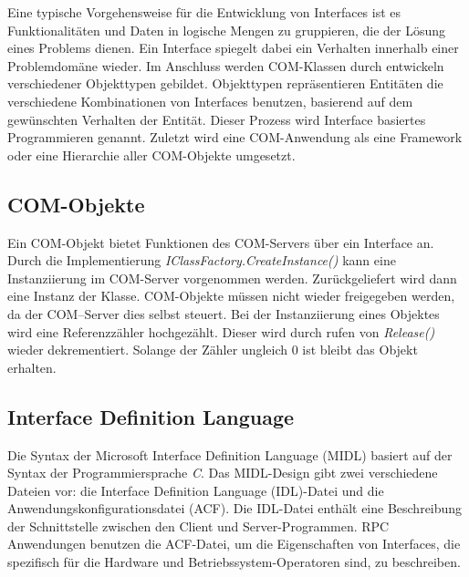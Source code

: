 Eine typische Vorgehensweise für die Entwicklung von Interfaces ist es Funktionalitäten und Daten in logische Mengen zu gruppieren, die der Lösung eines Problems dienen. Ein Interface spiegelt dabei ein Verhalten innerhalb einer Problemdomäne wieder. Im Anschluss werden COM-Klassen durch entwickeln verschiedener Objekttypen gebildet. Objekttypen repräsentieren Entitäten die verschiedene Kombinationen von Interfaces benutzen, basierend auf dem gewünschten Verhalten der Entität. Dieser Prozess wird Interface basiertes Programmieren genannt. Zuletzt wird eine COM-Anwendung als eine Framework oder eine Hierarchie aller COM-Objekte umgesetzt.

\subsection{COM-Objekte}
\label{ch:grundlagen:sec:ComponentObjectModel:subsec:COMObjekte}

Ein COM-Objekt bietet Funktionen des COM-Servers über ein Interface an. Durch die Implementierung \textit{IClassFactory.CreateInstance()} kann eine Instanziierung im COM-Server vorgenommen werden. Zurückgeliefert wird dann eine Instanz der Klasse. COM-Objekte müssen nicht wieder freigegeben werden, da der COM–Server dies selbst steuert. Bei der Instanziierung eines Objektes  wird eine Referenzzähler hochgezählt. Dieser wird durch rufen von \textit{Release()} wieder dekrementiert. Solange der Zähler ungleich 0 ist bleibt das Objekt erhalten. 

\subsection{Interface Definition Language}
\label{ch:grundlagen:sec:ComponentObjectModel:subsec:InterfaceDefinitionLanguage}

Die Syntax der Microsoft Interface Definition Language (MIDL) basiert auf der Syntax der Programmiersprache \textit{C}. Das MIDL-Design gibt zwei verschiedene Dateien vor: die Interface Definition Language (IDL)-Datei und die Anwendungskonfigurationsdatei (ACF). Die IDL-Datei enthält eine Beschreibung der Schnittstelle zwischen den Client und Server-Programmen. RPC Anwendungen benutzen die ACF-Datei, um die Eigenschaften von Interfaces, die spezifisch für die Hardware und Betriebssystem-Operatoren sind, zu beschreiben.